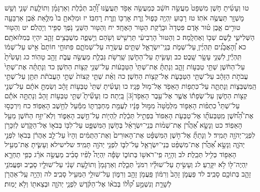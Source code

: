 \documentclass[twoside, openany, parskip=half, 11pt]{book}
\begin{document}
טו וְעָשִׂ֜יתָ חֹ֤שֶׁן מִשְׁפָּט֙ מַעֲשֵׂ֣ה חֹשֵׁ֔ב כְּמַעֲשֵׂ֥ה אֵפֹ֖ד תַּעֲשֶׂ֑נּוּ זָ֠הָ֠ב תְּכֵ֨לֶת וְאַרְגָּמָ֜ן וְתוֹלַ֧עַת שָׁנִ֛י וְשֵׁ֥שׁ מׇשְׁזָ֖ר תַּעֲשֶׂ֥ה אֹתֽוֹ׃ טז רָב֥וּעַ יִֽהְיֶ֖ה כָּפ֑וּל זֶ֥רֶת אׇרְכּ֖וֹ וְזֶ֥רֶת רׇחְבּֽוֹ׃ יז וּמִלֵּאתָ֥ בוֹ֙ מִלֻּ֣אַת אֶ֔בֶן אַרְבָּעָ֖ה טוּרִ֣ים אָ֑בֶן ט֗וּר אֹ֤דֶם פִּטְדָה֙ וּבָרֶ֔קֶת הַטּ֖וּר הָאֶחָֽד׃ יח וְהַטּ֖וּר הַשֵּׁנִ֑י נֹ֥פֶךְ סַפִּ֖יר וְיָהֲלֹֽם׃ יט וְהַטּ֖וּר הַשְּׁלִישִׁ֑י לֶ֥שֶׁם שְׁב֖וֹ וְאַחְלָֽמָה׃ כ וְהַטּוּר֙ הָרְבִיעִ֔י תַּרְשִׁ֥ישׁ וְשֹׁ֖הַם וְיָשְׁפֵ֑ה מְשֻׁבָּצִ֥ים זָהָ֛ב יִהְי֖וּ בְּמִלּוּאֹתָֽם׃ כא וְ֠הָאֲבָנִ֠ים תִּֽהְיֶ֜יןָ עַל־שְׁמֹ֧ת בְּנֵֽי־יִשְׂרָאֵ֛ל שְׁתֵּ֥ים עֶשְׂרֵ֖ה עַל־שְׁמֹתָ֑ם פִּתּוּחֵ֤י חוֹתָם֙ אִ֣ישׁ עַל־שְׁמ֔וֹ תִּֽהְיֶ֕יןָ לִשְׁנֵ֥י עָשָׂ֖ר שָֽׁבֶט׃ כב וְעָשִׂ֧יתָ עַל־הַחֹ֛שֶׁן שַֽׁרְשֹׁ֥ת גַּבְלֻ֖ת מַעֲשֵׂ֣ה עֲבֹ֑ת זָהָ֖ב טָהֽוֹר׃ כג וְעָשִׂ֙יתָ֙ עַל־הַחֹ֔שֶׁן שְׁתֵּ֖י טַבְּע֣וֹת זָהָ֑ב וְנָתַתָּ֗ אֶת־שְׁתֵּי֙ הַטַּבָּע֔וֹת עַל־שְׁנֵ֖י קְצ֥וֹת הַחֹֽשֶׁן׃ כד וְנָתַתָּ֗ה אֶת־שְׁתֵּי֙ עֲבֹתֹ֣ת הַזָּהָ֔ב עַל־שְׁתֵּ֖י הַטַּבָּעֹ֑ת אֶל־קְצ֖וֹת הַחֹֽשֶׁן׃ כה וְאֵ֨ת שְׁתֵּ֤י קְצוֹת֙ שְׁתֵּ֣י הָעֲבֹתֹ֔ת תִּתֵּ֖ן עַל־שְׁתֵּ֣י הַֽמִּשְׁבְּצ֑וֹת וְנָתַתָּ֛ה עַל־כִּתְפ֥וֹת הָאֵפֹ֖ד אֶל־מ֥וּל פָּנָֽיו׃ כו וְעָשִׂ֗יתָ שְׁתֵּי֙ טַבְּע֣וֹת זָהָ֔ב וְשַׂמְתָּ֣ אֹתָ֔ם עַל־שְׁנֵ֖י קְצ֣וֹת הַחֹ֑שֶׁן עַל־שְׂפָת֕וֹ אֲשֶׁ֛ר אֶל־עֵ֥בֶר הָאֵפֹ֖ד‏[3] בָּֽיְתָה׃ כז וְעָשִׂ֘יתָ֮ שְׁתֵּ֣י טַבְּע֣וֹת זָהָב֒ וְנָתַתָּ֣ה אֹתָ֡ם עַל־שְׁתֵּי֩ כִתְפ֨וֹת הָאֵפ֤וֹד מִלְּמַ֙טָּה֙ מִמּ֣וּל פָּנָ֔יו לְעֻמַּ֖ת מַחְבַּרְתּ֑וֹ מִמַּ֕עַל לְחֵ֖שֶׁב הָאֵפֽוֹד׃ כח וְיִרְכְּס֣וּ אֶת־הַ֠חֹ֠שֶׁן מִֽטַּבְּעֹתָ֞ו אֶל־טַבְּעֹ֤ת הָאֵפוֹד֙ בִּפְתִ֣יל תְּכֵ֔לֶת לִֽהְי֖וֹת עַל־חֵ֣שֶׁב הָאֵפ֑וֹד וְלֹֽא־יִזַּ֣ח הַחֹ֔שֶׁן מֵעַ֖ל הָאֵפֽוֹד׃ כט וְנָשָׂ֣א אַ֠הֲרֹ֠ן אֶת־שְׁמ֨וֹת בְּנֵֽי־יִשְׂרָאֵ֜ל בְּחֹ֧שֶׁן הַמִּשְׁפָּ֛ט עַל־לִבּ֖וֹ בְּבֹא֣וֹ אֶל־הַקֹּ֑דֶשׁ לְזִכָּרֹ֥ן לִפְנֵֽי־יְהֹוָ֖ה תָּמִֽיד׃ ל וְנָתַתָּ֞ אֶל־חֹ֣שֶׁן הַמִּשְׁפָּ֗ט אֶת־הָאוּרִים֙ וְאֶת־הַתֻּמִּ֔ים וְהָיוּ֙ עַל־לֵ֣ב אַהֲרֹ֔ן בְּבֹא֖וֹ לִפְנֵ֣י יְהֹוָ֑ה וְנָשָׂ֣א אַ֠הֲרֹ֠ן אֶת־מִשְׁפַּ֨ט בְּנֵי־יִשְׂרָאֵ֧ל עַל־לִבּ֛וֹ לִפְנֵ֥י יְהֹוָ֖ה תָּמִֽיד׃
שלישילא וְעָשִׂ֛יתָ אֶת־מְעִ֥יל הָאֵפ֖וֹד כְּלִ֥יל תְּכֵֽלֶת׃ לב וְהָיָ֥ה פִֽי־רֹאשׁ֖וֹ בְּתוֹכ֑וֹ שָׂפָ֡ה יִֽהְיֶה֩ לְפִ֨יו סָבִ֜יב מַעֲשֵׂ֣ה אֹרֵ֗ג כְּפִ֥י תַחְרָ֛א יִֽהְיֶה־לּ֖וֹ לֹ֥א יִקָּרֵֽעַ׃ לג וְעָשִׂ֣יתָ עַל־שׁוּלָ֗יו רִמֹּנֵי֙ תְּכֵ֤לֶת וְאַרְגָּמָן֙ וְתוֹלַ֣עַת שָׁנִ֔י עַל־שׁוּלָ֖יו סָבִ֑יב וּפַעֲמֹנֵ֥י זָהָ֛ב בְּתוֹכָ֖ם סָבִֽיב׃ לד פַּעֲמֹ֤ן זָהָב֙ וְרִמּ֔וֹן פַּֽעֲמֹ֥ן זָהָ֖ב וְרִמּ֑וֹן עַל־שׁוּלֵ֥י הַמְּעִ֖יל סָבִֽיב׃ לה וְהָיָ֥ה עַֽל־אַהֲרֹ֖ן לְשָׁרֵ֑ת וְנִשְׁמַ֣ע ק֠וֹל֠וֹ בְּבֹא֨וֹ אֶל־הַקֹּ֜דֶשׁ לִפְנֵ֧י יְהֹוָ֛ה וּבְצֵאת֖וֹ וְלֹ֥א יָמֽוּת׃
\end{document}
